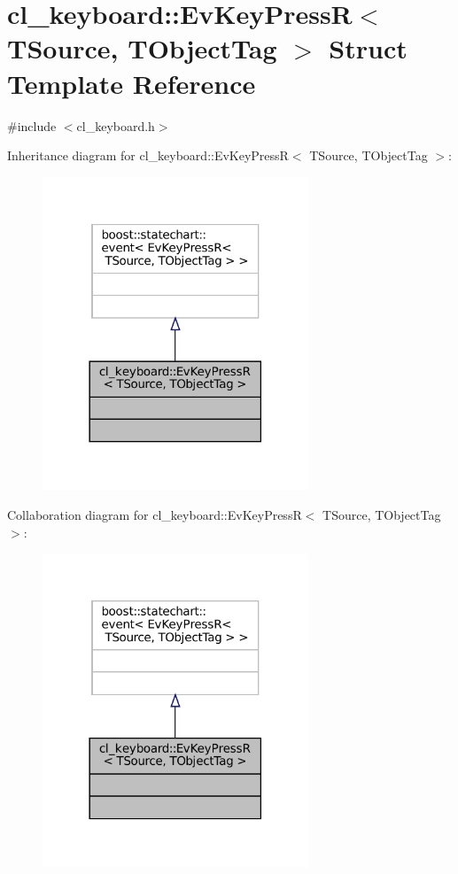 \hypertarget{structcl__keyboard_1_1EvKeyPressR}{}\section{cl\+\_\+keyboard\+:\+:Ev\+Key\+PressR$<$ T\+Source, T\+Object\+Tag $>$ Struct Template Reference}
\label{structcl__keyboard_1_1EvKeyPressR}


{\ttfamily \#include $<$cl\+\_\+keyboard.\+h$>$}



Inheritance diagram for cl\+\_\+keyboard\+:\+:Ev\+Key\+PressR$<$ T\+Source, T\+Object\+Tag $>$\+:
\nopagebreak
\begin{figure}[H]
\begin{center}
\leavevmode
\includegraphics[width=225pt]{structcl__keyboard_1_1EvKeyPressR__inherit__graph}
\end{center}
\end{figure}


Collaboration diagram for cl\+\_\+keyboard\+:\+:Ev\+Key\+PressR$<$ T\+Source, T\+Object\+Tag $>$\+:
\nopagebreak
\begin{figure}[H]
\begin{center}
\leavevmode
\includegraphics[width=225pt]{structcl__keyboard_1_1EvKeyPressR__coll__graph}
\end{center}
\end{figure}


